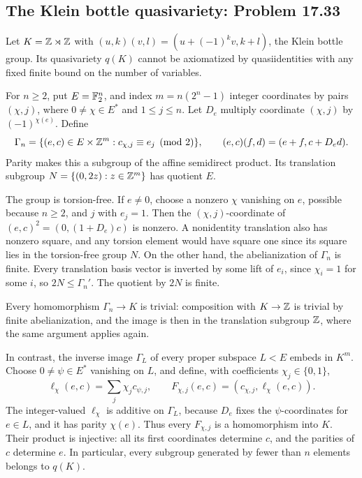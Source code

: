 \subsection{The Klein bottle quasivariety: Problem 17.33}
\label{cand:17.33}

Let \(K=\mathbb Z\rtimes\mathbb Z\) with
\((u,k)(v,l)=(u+(-1)^kv,k+l)\), the Klein bottle group.
Its quasivariety \(q(K)\) cannot be axiomatized by
quasiidentities with any fixed finite bound on the number
of variables.

For \(n\geq2\), put \(E=\mathbb F_2^n\), and index \(m=n(2^n-1)\)
integer coordinates by pairs \((\chi,j)\), where
\(0\ne\chi\in E^*\) and \(1\leq j\leq n\).
Let \(D_e\) multiply coordinate \((\chi,j)\) by
\((-1)^{\chi(e)}\). Define
\[
 \Gamma_n=\{(e,c)\in E\times\mathbb Z^m:
              c_{\chi,j}\equiv e_j\pmod2\},\qquad
 (e,c)(f,d)=(e+f,c+D_ed).
\]
Parity makes this a subgroup of the affine semidirect product.
Its translation subgroup \(N=\{(0,2z):z\in\mathbb Z^m\}\)
has quotient \(E\).

The group is torsion-free. If \(e\ne0\), choose a nonzero
\(\chi\) vanishing on \(e\), possible because \(n\geq2\),
and \(j\) with \(e_j=1\). Then the \((\chi,j)\)-coordinate
of \((e,c)^2=(0,(1+D_e)c)\) is nonzero. A nonidentity
translation also has nonzero square, and any torsion element
would have square one since its square lies in the
torsion-free group \(N\). On the other hand, the
abelianization of \(\Gamma_n\) is finite. Every translation
basis vector is inverted by some lift of \(e_i\), since
\(\chi_i=1\) for some \(i\), so \(2N\leq\Gamma_n'\).
The quotient by \(2N\) is finite.

Every homomorphism \(\Gamma_n\to K\) is trivial: composition
with \(K\to\mathbb Z\) is trivial by finite abelianization, and
the image is then in the translation subgroup \(\mathbb Z\), where
the same argument applies again.

In contrast, the inverse image \(\Gamma_L\) of every proper
subspace \(L<E\) embeds in \(K^m\). Choose \(0\ne\psi\in E^*\)
vanishing on \(L\), and define, with coefficients
\(\chi_j\in\{0,1\}\),
\[
 \ell_\chi(e,c)=\sum_j\chi_j c_{\psi,j},\qquad
 F_{\chi,j}(e,c)=(c_{\chi,j},\ell_\chi(e,c)).
\]
The integer-valued \(\ell_\chi\) is additive on \(\Gamma_L\),
because \(D_e\) fixes the \(\psi\)-coordinates for \(e\in L\),
and it has parity \(\chi(e)\). Thus every \(F_{\chi,j}\)
is a homomorphism into \(K\). Their product is injective:
all its first coordinates determine \(c\), and the parities
of \(c\) determine \(e\). In particular, every subgroup
generated by fewer than \(n\) elements belongs to \(q(K)\).

